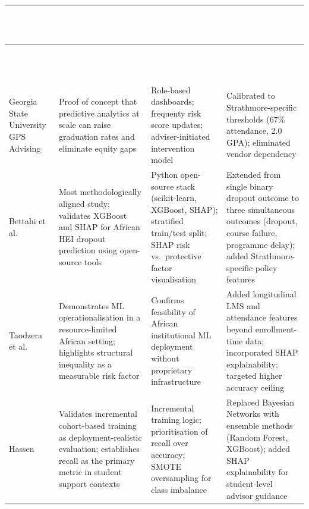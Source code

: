 \documentclass[12pt]{report}
\begin{document}
\begin{longtable}{L{2.4cm} L{3.3cm} L{3.3cm} L{3.8cm}}

\textcolor{white}{\textbf{Study}} &
\textcolor{white}{\textbf{Contribution to This Study}} &
\textcolor{white}{\textbf{Design Element Adopted}} &
\textcolor{white}{\textbf{Design Element Improved or Departed From}} \\
\endfirsthead

\textcolor{white}{\textbf{Study}} &
\textcolor{white}{\textbf{Contribution to This Study}} &
\textcolor{white}{\textbf{Design Element Adopted}} &
\textcolor{white}{\textbf{Design Element Improved or Departed From}} \\
\endhead

Georgia State University GPS Advising \parencite{GSU2024} &
Proof of concept that predictive analytics at scale can raise graduation rates and eliminate equity gaps &
Role-based dashboards; frequenty risk score updates; adviser-initiated intervention model &
Calibrated to Strathmore-specific thresholds (67\% attendance, 2.0 GPA); eliminated vendor dependency \\[6pt]

Bettahi et al.\ \parencite{bettahi2025} &
Most methodologically aligned study; validates XGBoost and SHAP for African HEI dropout prediction using open-source tools &
Python open-source stack (scikit-learn, XGBoost, SHAP); stratified train/test split; SHAP risk vs.\ protective factor visualisation &
Extended from single binary dropout outcome to three simultaneous outcomes (dropout, course failure, programme delay); added Strathmore-specific policy features \\[6pt]

Taodzera et al.\ \parencite{taodzera2016} &
Demonstrates ML operationalisation in a resource-limited African setting; highlights structural inequality as a measurable risk factor &
Confirms feasibility of African institutional ML deployment without proprietary infrastructure &
Added longitudinal LMS and attendance features beyond enrollment-time data; incorporated SHAP explainability; targeted higher accuracy ceiling \\[6pt]

Hassen \parencite{hassen2020} &
Validates incremental cohort-based training as deployment-realistic evaluation; establishes recall as the primary metric in student support contexts &
Incremental training logic; prioritisation of recall over accuracy; SMOTE oversampling for class imbalance &
Replaced Bayesian Networks with ensemble methods (Random Forest, XGBoost); added SHAP explainability for student-level advisor guidance \\[6pt]


\end{longtable}
\end{document}
